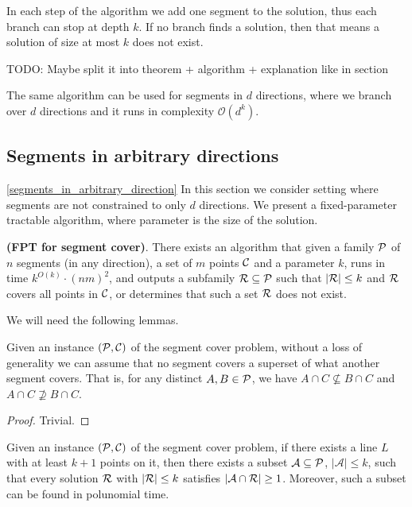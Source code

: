 In each step of the algorithm we add one segment to the solution,
thus each branch can stop at depth $k$.
If no branch finds a solution, then that means a solution of size at most $k$ does not exist.

TODO: Maybe split it into theorem + algorithm + explanation like in 
section

\begin{remark}
The same algorithm can be used for segments in $d$ directions,
where we branch over $d$ directions and it runs in complexity $\mathcal{O}(d^k)$.
\end{remark}

\subsection{Segments in arbitrary directions}
\ref{segments_in_arbitrary_direction}
In this section we consider setting where segments are not constrained
to only $d$ directions. 
We present a fixed-parameter tractable algorithm,
where parameter is the size of the solution.

\begin{tw}{
	\label{segment_cover_fpt}
	\textbf{(FPT for segment cover)}.
	There exists an algorithm that given a family $\mathcal{P}$ of
	$n$ segments (in any direction),
	a set of $m$ points $\mathcal{C}$
	and a parameter $k$,
	runs in time $k^{O(k)} \cdot (nm)^2$,
	and outputs a subfamily $\mathcal{R} \subseteq \mathcal{P}$
	such that $|\mathcal{R}| \le k$ and $\mathcal{R}$ covers all points in $\mathcal{C}$,
	or determines that such a set $\mathcal{R}$ does not exist.
}\end{tw}

We will need the following lemmas.

\begin{lemma}
   \label{fpt_reduction}
   Given an instance $(\mathcal{P}, \mathcal{C})$ of the segment cover problem,
   without a loss of generality we can assume that
   no segment covers a superset of what another segment covers.
   That is, for any distinct $A, B \in \mathcal{P}$, we have
   $A \cap C \not \subseteq B \cap C$ and $A \cap C \not \supseteq B \cap C$.
\end{lemma}   
   
\begin{proof} Trivial. \end{proof}

\begin{lemma}
	\label{fpt_long_lines}
	Given an instance $(\mathcal{P}, \mathcal{C})$ of the segment cover problem,
	if there exists a line $L$ with at least
	$k+1$ points on it, then there exists a subset $\mathcal{A} \subseteq \mathcal{P}$,
	$|\mathcal{A}| \le k$,
	such that every solution $\mathcal{R}$ with $|\mathcal{R}| \le k$
	satisfies $|\mathcal{A} \cap \mathcal{R}| \ge 1$.
	Moreover, such a subset can be found in polunomial time.
\end{lemma}

